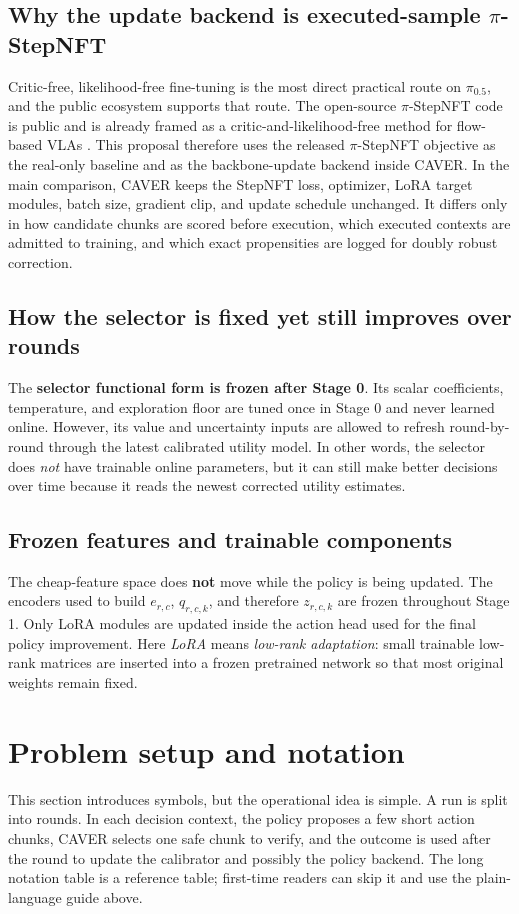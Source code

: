 \documentclass[10pt]{article}
\theoremstyle{plain}
\theoremstyle{definition}
\theoremstyle{remark}
\begin{document}
\subsection{Why the update backend is executed-sample \texorpdfstring{$\pi$-StepNFT}{pi-StepNFT}}
Critic-free, likelihood-free fine-tuning is the most direct practical route on $\pi_{0.5}$, and the public ecosystem supports that route. The open-source $\pi$-StepNFT code is public and is already framed as a critic-and-likelihood-free method for flow-based VLAs \citep{wang2026pistepnft,pistepnftrepo2026}. This proposal therefore uses the released $\pi$-StepNFT objective as the real-only baseline and as the backbone-update backend inside CAVER. In the main comparison, CAVER keeps the StepNFT loss, optimizer, LoRA target modules, batch size, gradient clip, and update schedule unchanged. It differs only in how candidate chunks are scored before execution, which executed contexts are admitted to training, and which exact propensities are logged for doubly robust correction.

\subsection{How the selector is fixed yet still improves over rounds}
The \textbf{selector functional form is frozen after Stage 0}. Its scalar coefficients, temperature, and exploration floor are tuned once in Stage 0 and never learned online. However, its value and uncertainty inputs are allowed to refresh round-by-round through the latest calibrated utility model. In other words, the selector does \emph{not} have trainable online parameters, but it can still make better decisions over time because it reads the newest corrected utility estimates.

\subsection{Frozen features and trainable components}
The cheap-feature space does \textbf{not} move while the policy is being updated. The encoders used to build $e_{r,c}$, $q_{r,c,k}$, and therefore $z_{r,c,k}$ are frozen throughout Stage 1. Only LoRA modules are updated inside the action head used for the final policy improvement. Here \emph{LoRA} means \emph{low-rank adaptation}: small trainable low-rank matrices are inserted into a frozen pretrained network so that most original weights remain fixed.

\section{Problem setup and notation}
This section introduces symbols, but the operational idea is simple. A run is split into rounds. In each decision context, the policy proposes a few short action chunks, CAVER selects one safe chunk to verify, and the outcome is used after the round to update the calibrator and possibly the policy backend. The long notation table is a reference table; first-time readers can skip it and use the plain-language guide above.
\end{document}

